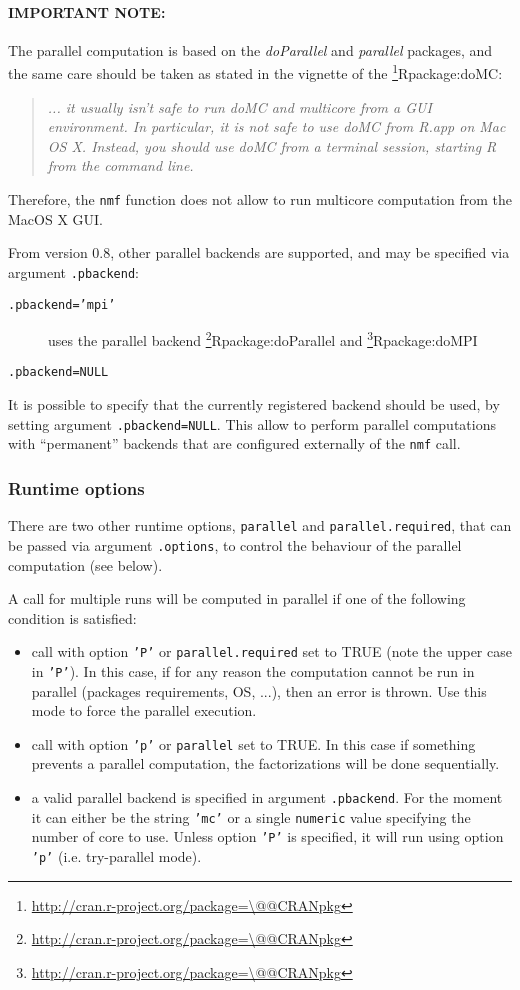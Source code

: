 \documentclass[a4paper]{article}\usepackage{graphicx, color}
\makeatletter
\let\code=\texttt
\newcommand{\pkgname}[1]{\textit{#1}\xspace}
\newcommand{\CRANurl}[1]{\url{http://cran.r-project.org/package=#1}}
\def\CRANpkg{\@ifstar\@CRANpkg\@@CRANpkg}
\def\@CRANpkg#1{\href{http://cran.r-project.org/package=#1}{\pkgname{#1}}\footnote{\CRANurl{#1}}}
\def\@@CRANpkg#1{\href{http://cran.r-project.org/package=#1}{\pkgname{#1}} package\footnote{\CRANurl{#1}}}
\def\citeCRANpkg{\@ifstar\@citeCRANpkg\@@citeCRANpkg}
\def\@citeCRANpkg#1{\CRANpkg{#1}\cite*{Rpackage:#1}}
\def\@@citeCRANpkg#1{\CRANpkg{#1}~\cite{Rpackage:#1}}
\renewcommand{\cite}[1]{\parencite{#1}}
\makeatother
\begin{document}
\medskip
\paragraph{IMPORTANT NOTE:} 
The parallel computation is based on the \pkgname{doParallel} and
\pkgname{parallel} packages, and the same care should be taken as stated in the
vignette of the \citeCRANpkg{doMC}:
\begin{quote}
\emph{... it usually isn't safe to run doMC and multicore from a GUI environment. 
In particular, it is not safe to use doMC from R.app on Mac OS X. 
Instead, you should use doMC from a terminal session, starting R from the command line.}
\end{quote}
Therefore, the \code{nmf} function does not allow to run multicore computation from the 
MacOS X GUI.

From version 0.8, other parallel backends are supported, and may be specified
via argument \code{.pbackend}:

\begin{description}
  \item[\code{.pbackend='mpi'}] uses the parallel backend \citeCRANpkg{doParallel} and \citeCRANpkg{doMPI} 
  \item[\code{.pbackend=NULL}]{}
\end{description}

It is possible to specify that the currently registered backend should be
used, by setting argument \code{.pbackend=NULL}.
This allow to perform parallel computations with ``permanent'' backends that are
configured externally of the \code{nmf} call.

\subsubsection{Runtime options}
There are two other runtime options, \code{parallel} and
\code{parallel.required}, that can be passed via argument \code{.options}, to
control the behaviour of the parallel computation (see below).

\medskip
A call for multiple runs will be computed in parallel if one of the following condition is satisfied:

\begin{itemize}
\item call with option \code{'P'} or \code{parallel.required} set to TRUE (note the upper case in \code{'P'}). 
In this case, if for any reason the computation cannot be run in parallel (packages requirements, OS, ...), then an error is thrown. Use this mode to force the parallel execution.
\item call with option \code{'p'} or \code{parallel} set to TRUE. In this case if something prevents a parallel computation, the factorizations will be done 
sequentially.
\item a valid parallel backend is specified in argument \code{.pbackend}. 
For the moment it can either be the string \code{'mc'} or a single \code{numeric} value specifying the number of core to use. Unless option \code{'P'} is specified, it will run using option \code{'p'} (i.e. try-parallel mode).
\end{itemize}
\end{document}
